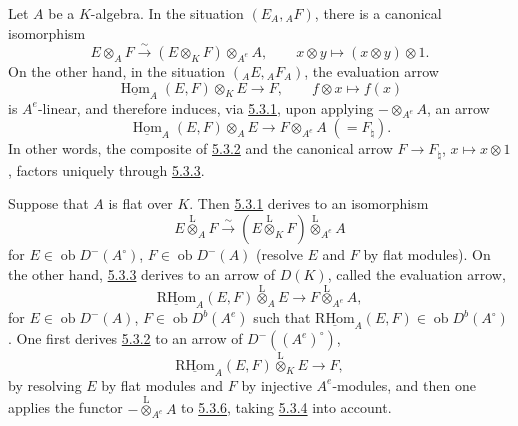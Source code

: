 \documentclass[11pt]{article}
\providecommand{\uHom}{\underline{\Hom}}
\providecommand{\uRHom}{\underline{\RHom}}
\DeclareMathOperator{\Hom}{Hom}
\newcommand{\ob}{\operatorname{ob}}
\providecommand{\RHom}{\mathrm{RHom}}
\providecommand{\lten}{\overset{\mathrm L}{\otimes}}
\providecommand{\RHom}{\mathrm{RHom}}
\providecommand{\Hom}{\operatorname{Hom}}
\providecommand{\ob}{\operatorname{ob}}
\providecommand{\lten}{\overset{\mathrm L}{\otimes}}
\providecommand{\RHom}{\mathrm R\mathcal{H}om}
\providecommand{\lten}{\overset{\mathrm L}{\otimes}}
\providecommand{\lten}{\overset{\mathrm L}{\otimes}}
\providecommand{\lten}{\overset{\mathrm L}{\otimes}}
\providecommand{\lten}{\overset{\mathrm L}{\otimes}}
\providecommand{\RHom}{\mathrm{RHom}}
\providecommand{\Hom}{\operatorname{Hom}}
\providecommand{\lten}{\overset{\mathrm L}{\otimes}}
\begin{document}
Let $A$ be a $K$-algebra. In the situation $(E_A,{}_AF)$, there is a canonical isomorphism
\begin{equation}\tag{5.3.1}\label{sga5:IIIB:equation:5.3.1}
E\otimes_AF\xrightarrow{\sim}(E\otimes_KF)\otimes_{A^e}A,
\qquad x\otimes y\longmapsto (x\otimes y)\otimes 1.
\end{equation}
On the other hand, in the situation $({}_AE,{}_AF_A)$, the evaluation arrow
\begin{equation}\tag{5.3.2}\label{sga5:IIIB:equation:5.3.2}
\uHom_A(E,F)\otimes_KE\longrightarrow F,
\qquad f\otimes x\longmapsto f(x)
\end{equation}
is $A^e$-linear, and therefore induces, via \hyperref[sga5:IIIB:equation:5.3.1]{5.3.1}, upon applying $-\otimes_{A^e}A$, an arrow
\begin{equation}\tag{5.3.3}\label{sga5:IIIB:equation:5.3.3}
\uHom_A(E,F)\otimes_AE\longrightarrow F\otimes_{A^e}A\;(=F_\natural).
\end{equation}
In other words, the composite of \hyperref[sga5:IIIB:equation:5.3.2]{5.3.2} and the canonical arrow $F\to F_\natural$, $x\mapsto x\otimes 1$, factors uniquely through \hyperref[sga5:IIIB:equation:5.3.3]{5.3.3}.

Suppose that $A$ is flat over $K$. Then \hyperref[sga5:IIIB:equation:5.3.1]{5.3.1} derives to an isomorphism
\begin{equation}\tag{5.3.4}\label{sga5:IIIB:equation:5.3.4}
E\lten_AF\xrightarrow{\sim}(E\lten_KF)\lten_{A^e}A
\end{equation}
for $E\in\ob D^-(A^\circ)$, $F\in\ob D^-(A)$ (resolve $E$ and $F$ by flat modules). On the other hand, \hyperref[sga5:IIIB:equation:5.3.3]{5.3.3} derives to an arrow of $D(K)$, called the evaluation arrow,
\begin{equation}\tag{5.3.5}\label{sga5:IIIB:equation:5.3.5}
\uRHom_A(E,F)\lten_AE\longrightarrow F\lten_{A^e}A,
\end{equation}
for $E\in\ob D^-(A)$, $F\in\ob D^b(A^e)$ such that $\uRHom_A(E,F)\in\ob D^b(A^\circ)$. One first derives \hyperref[sga5:IIIB:equation:5.3.2]{5.3.2} to an arrow of $D^-((A^e)^\circ)$,
\begin{equation}\tag{5.3.6}\label{sga5:IIIB:equation:5.3.6}
\uRHom_A(E,F)\lten_KE\longrightarrow F,
\end{equation}
by resolving $E$ by flat modules and $F$ by injective $A^e$-modules, and then one applies the functor $-\lten_{A^e}A$ to \hyperref[sga5:IIIB:equation:5.3.6]{5.3.6}, taking \hyperref[sga5:IIIB:equation:5.3.4]{5.3.4} into account.
\end{document}

